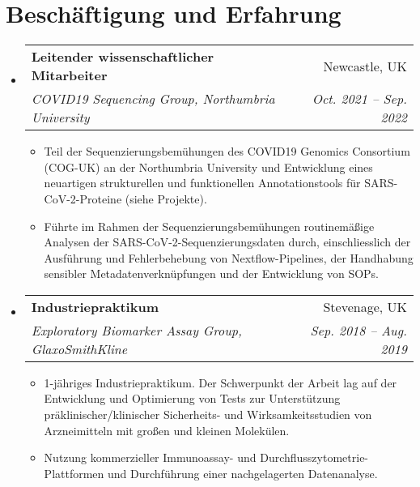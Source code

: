\documentclass[a4paper,11pt]{article}
\makeatletter
\newcommand{\resumeItem}[1]{
  \item\small{
    {#1 \vspace{-2pt}}
  }
}
\newcommand{\resumeSubheading}[4]{
  \vspace{-2pt}\item
    \begin{tabular*}{0.97\textwidth}[t]{l@{\extracolsep{\fill}}r}
      \textbf{#1} & #2 \\
      \textit{\small#3} & \textit{\small #4} \\
    \end{tabular*}\vspace{-7pt}
}
\newcommand{\resumeSubHeadingListStart}{\begin{itemize}[leftmargin=0.15in, label={}]}
\newcommand{\resumeSubHeadingListEnd}{\end{itemize}}
\newcommand{\resumeItemListStart}{\begin{itemize}}
\newcommand{\resumeItemListEnd}{\end{itemize}\vspace{-5pt}}
\makeatother
\begin{document}
\section{Beschäftigung und Erfahrung}
  \resumeSubHeadingListStart
    \resumeSubheading
      {Leitender wissenschaftlicher Mitarbeiter}{Newcastle, UK}
      {COVID19 Sequencing Group, Northumbria University}{Oct. 2021 -- Sep. 2022}
      \resumeItemListStart
        \resumeItem{Teil der Sequenzierungsbemühungen des COVID19 Genomics Consortium (COG-UK) an der Northumbria University und Entwicklung eines neuartigen strukturellen und funktionellen Annotationstools für SARS-CoV-2-Proteine ​​(siehe Projekte).}
        \resumeItem{Führte im Rahmen der Sequenzierungsbemühungen routinemäßige Analysen der SARS-CoV-2-Sequenzierungsdaten durch, einschliesslich der Ausführung und Fehlerbehebung von Nextflow-Pipelines, der Handhabung sensibler Metadatenverknüpfungen und der Entwicklung von SOPs.}
      \resumeItemListEnd
    \resumeSubheading
      {Industriepraktikum}{Stevenage, UK}
      {Exploratory Biomarker Assay Group, GlaxoSmithKline}{Sep. 2018 -- Aug. 2019}
      \resumeItemListStart
        \resumeItem{1-jähriges Industriepraktikum. Der Schwerpunkt der Arbeit lag auf der Entwicklung und Optimierung von Tests zur Unterstützung präklinischer/klinischer Sicherheits- und Wirksamkeitsstudien von Arzneimitteln mit großen und kleinen Molekülen.}
        \resumeItem{Nutzung kommerzieller Immunoassay- und Durchflusszytometrie-Plattformen und Durchführung einer nachgelagerten Datenanalyse.}
      \resumeItemListEnd
  \resumeSubHeadingListEnd


\end{document}
